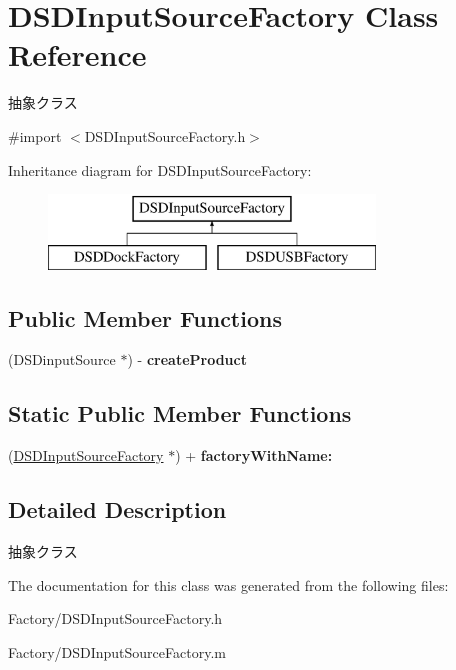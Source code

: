 \hypertarget{interface_d_s_d_input_source_factory}{\section{D\-S\-D\-Input\-Source\-Factory Class Reference}
\label{interface_d_s_d_input_source_factory}
}


抽象クラス  




{\ttfamily \#import $<$D\-S\-D\-Input\-Source\-Factory.\-h$>$}

Inheritance diagram for D\-S\-D\-Input\-Source\-Factory\-:\begin{figure}[H]
\begin{center}
\leavevmode
\includegraphics[height=2.000000cm]{interface_d_s_d_input_source_factory}
\end{center}
\end{figure}
\subsection*{Public Member Functions}
\begin{DoxyCompactItemize}
\item 
\hypertarget{interface_d_s_d_input_source_factory_a2ee3848d0feb6aab141b9111a1b8ae31}{(D\-S\-Dinput\-Source $\ast$) -\/ {\bfseries create\-Product}}\label{interface_d_s_d_input_source_factory_a2ee3848d0feb6aab141b9111a1b8ae31}

\end{DoxyCompactItemize}
\subsection*{Static Public Member Functions}
\begin{DoxyCompactItemize}
\item 
\hypertarget{interface_d_s_d_input_source_factory_af186c01088234e970a8619cfa256cb64}{(\hyperlink{interface_d_s_d_input_source_factory}{D\-S\-D\-Input\-Source\-Factory} $\ast$) + {\bfseries factory\-With\-Name\-:}}\label{interface_d_s_d_input_source_factory_af186c01088234e970a8619cfa256cb64}

\end{DoxyCompactItemize}


\subsection{Detailed Description}
抽象クラス 

The documentation for this class was generated from the following files\-:\begin{DoxyCompactItemize}
\item 
Factory/D\-S\-D\-Input\-Source\-Factory.\-h\item 
Factory/D\-S\-D\-Input\-Source\-Factory.\-m\end{DoxyCompactItemize}
